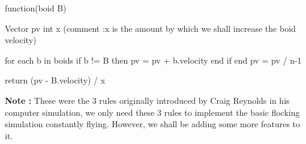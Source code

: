 \documentclass[12pt]{article}
\begin{document}
	function(boid B){ \newline

		Vector pv \newline
		int x (comment :x is the amount by which we shall increase the boid velocity) \newline

		for each b in boids \newline
			if b != B then \newline
				pv = pv + b.velocity \newline
			end if \newline
		end \newline
		pv = pv / n-1 \newline

		return (pv - B.velocity) / x \newline

	}

\textbf{Note : } These were the 3 rules originally introduced by Craig Reynolds in his computer simulation, we only need these 3 rules to implement the basic flocking simulation constantly flying. However, we shall be adding some more features to it.




%
%
% 
% 
\end{document}
